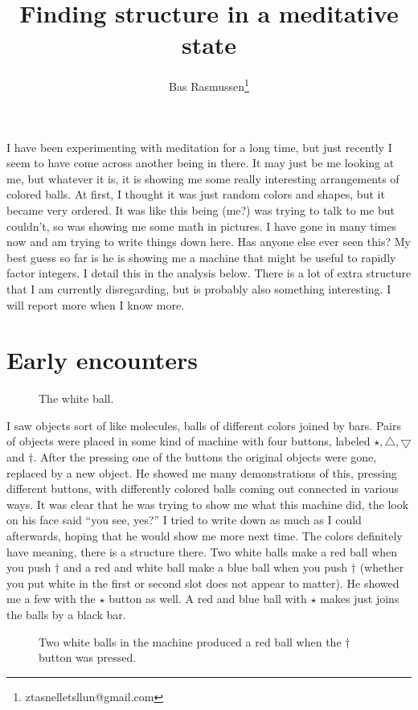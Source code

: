 \documentclass[12pt]{article}
\title{Finding structure in a meditative state}
\author{Bas Rasmussen\thanks{ztasnelletsllun@gmail.com}}
\newcommand{\gcd}{\operatorname{gcd}}
\def\gcd{\bigtriangledown}
\def\lcm{\bigtriangleup}
\begin{document}
\maketitle
I have been experimenting with meditation for a long time, but just recently I seem to have come across another being in there.  It may just be me looking at me, but whatever it is, it is
showing me some really interesting arrangements of colored balls.  At first, I thought it was just random colors and shapes, but it became very ordered.  It was like this being (me?)
was trying to talk to me but couldn't, so was showing me some math in pictures.   I have gone in many times now and am trying to write things down here.  Has anyone else
ever seen this?  My best guess so far is he is showing me a machine that might be useful to rapidly factor integers.  I detail this in the analysis below.  There is a lot of extra structure
that I am currently disregarding, but is probably also something interesting.  I will report more when I know more.

\section{Early encounters}
\begin{figure}
\centering
{}
\caption{The white ball.}
\end{figure}

I saw objects sort of like molecules, balls of different colors joined by bars.   Pairs of objects were placed in
some kind of machine with four buttons, labeled $\star, \lcm, \gcd$ and $\dagger$.  After the pressing one of the buttons the original
objects were gone, replaced by a new object.  He showed me many demonstrations of this, pressing different buttons, with differently colored balls coming out
connected in various ways.  It was clear that he was trying to show me what this machine did, the look on his face said ``you see, yes?''  I tried to write down as much
as I could afterwards, hoping that he would show me more next time.  The colors definitely have meaning, there is a structure there.  Two white balls
make a red ball when you push $\dagger$ and a red and white ball make a blue ball when you push $\dagger$ (whether you put white in the first or second slot
does not appear to matter).  He showed me a few with the $\star$ button as well.  A red and blue ball with $\star$ makes just joins the balls by a black bar.  
\begin{figure}
\centering
{}
\caption{Two white balls in the machine produced a red ball when the $\dagger$ button was pressed.}
\end{figure}
\end{document}
